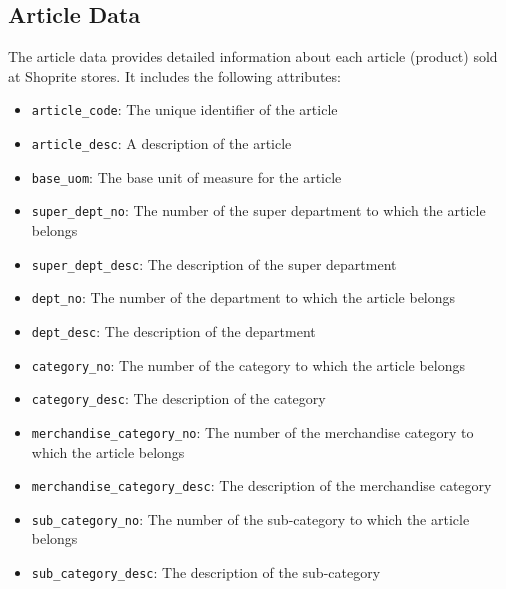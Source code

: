 \documentclass{article}
\begin{document}
\subsection{Article Data}
The article data provides detailed information about each article (product) sold at Shoprite stores. It includes the following attributes:
\begin{itemize}
  \item \texttt{article\_code}: The unique identifier of the article
  \item \texttt{article\_desc}: A description of the article
  \item \texttt{base\_uom}: The base unit of measure for the article
  \item \texttt{super\_dept\_no}: The number of the super department to which the article belongs
  \item \texttt{super\_dept\_desc}: The description of the super department
  \item \texttt{dept\_no}: The number of the department to which the article belongs
  \item \texttt{dept\_desc}: The description of the department
  \item \texttt{category\_no}: The number of the category to which the article belongs
  \item \texttt{category\_desc}: The description of the category
  \item \texttt{merchandise\_category\_no}: The number of the merchandise category to which the article belongs
  \item \texttt{merchandise\_category\_desc}: The description of the merchandise category
  \item \texttt{sub\_category\_no}: The number of the sub-category to which the article belongs
  \item \texttt{sub\_category\_desc}: The description of the sub-category
\end{itemize}
\end{document}
